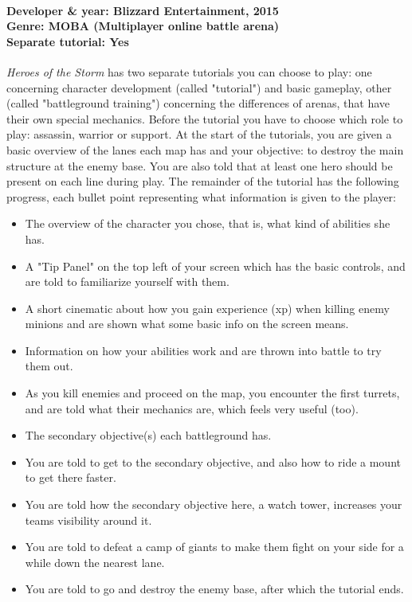 \paragraph{Developer \& year: Blizzard Entertainment, 2015 \\ Genre: MOBA (Multiplayer online battle arena) \\ Separate tutorial: Yes \\}
\textit{Heroes of the Storm} has two separate tutorials you can choose to play: one concerning character development (called "tutorial") and basic gameplay, other (called "battleground training") concerning the differences of arenas, that have their own special mechanics.
Before the tutorial you have to choose which role to play: assassin, warrior or support.
At the start of the tutorials, you are given a basic overview of the lanes each map has and your objective: to destroy the main structure at the enemy base. You are also told that at least one hero should be present on each line during play. The remainder of the tutorial has the following progress, each bullet point representing what information is given to the player:
\begin{itemize}

\item The overview of the character you chose, that is, what kind of abilities she has.
\item A "Tip Panel" on the top left of your screen which has the basic controls, and are told to familiarize yourself with them.
\item A short cinematic about how you gain experience (xp) when killing enemy minions and are shown what some basic info on the screen means.
\item Information on how your abilities work and are thrown into battle to try them out.
\item As you kill enemies and proceed on the map, you encounter the first turrets, and are told what their mechanics are, which feels very useful (too).
\item The secondary objective(s) each battleground has.
\item You are told to get to the secondary objective, and also how to ride a mount to get there faster.
\item You are told how the secondary objective here, a watch tower, increases your teams visibility around it.
\item You are told to defeat a camp of giants to make them fight on your side for a while down the nearest lane.
\item You are told to go and destroy the enemy base, after which the tutorial ends.
\end{itemize}


